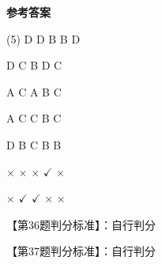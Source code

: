 \documentclass[11pt, a4paper]{article}
\begin{document}
\begin{center}
    \Huge \textbf{参考答案}
\end{center}

    \begin{tasks}[label=\arabic*. , label-width=14pt](5)
        \task D
        \task D
        \task B
        \task B
        \task D

        \task D
        \task C
        \task B
        \task D
        \task C

        \task A
        \task C
        \task A
        \task B
        \task C

        \task A
        \task C
        \task C
        \task B
        \task C

        \task D
        \task B
        \task C
        \task B
        \task B

        \task $\times$
        \task $\times$
        \task $\times$
        \task $\checkmark$
        \task $\times$

        \task $\times$
        \task $\checkmark$
        \task $\checkmark$
        \task $\times$
        \task $\times$
    \end{tasks}

    【第36题判分标准】：自行判分

    【第37题判分标准】：自行判分
\end{document}

